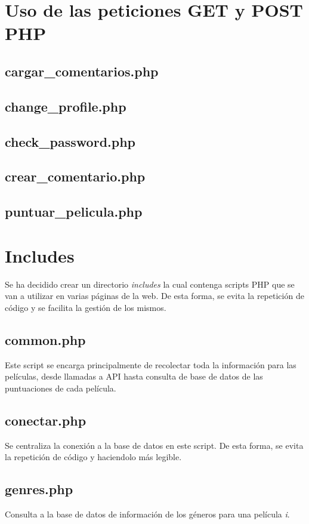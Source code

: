 \documentclass[a4paper, 12pt]{report}
\begin{document}
    \chapter{Uso de las peticiones GET y POST PHP}
    \section{cargar\_comentarios.php}
    \section{change\_profile.php}
    \section{check\_password.php}
    \section{crear\_comentario.php}
    \section{puntuar\_pelicula.php}


    \chapter{Includes}
    Se ha decidido crear un directorio \textit{includes} la cual contenga scripts PHP que se van a utilizar en varias páginas de la web. De esta forma, se evita la repetición de código y se facilita la gestión de los mismos.
    \section{common.php}
    Este script se encarga principalmente de recolectar toda la información para las películas, desde llamadas a API hasta consulta de base de datos de las puntuaciones de cada película.
    \section{conectar.php}
    Se centraliza la conexión a la base de datos en este script. De esta forma, se evita la repetición de código y haciendolo más legible.
    \section{genres.php}
    Consulta a la base de datos de información de los géneros para una película \textit{i}.
\end{document}

